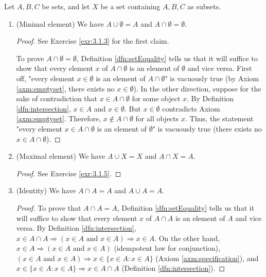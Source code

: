 \documentclass[../main.tex]{subfiles}
\begin{document}
\begin{enumerate}[ref={\thesection.\arabic*}]
    \begin{prp}\label{prp:booleanAlgebra}
        Let $A,B,C$ be sets, and let $X$ be a set containing $A,B,C$ as subsets.
        \begin{enumerate}[label={\textup{(}\alph*\textup{)}}]
            \item (Minimal element) We have $A\cup\emptyset=A$ and $A\cap\emptyset=\emptyset$.
            \begin{proof}
                See Exercise \ref{exr:3.1.3} for the first claim.\par
                To prove $A\cap\emptyset=\emptyset$, Definition \ref{dfn:setEquality} tells us that it will suffice to show that every element $x$ of $A\cap\emptyset$ is an element of $\emptyset$ and vice versa.
                First off, "every element $x\in\emptyset$ is an element of $A\cap\emptyset$" is vacuously true (by Axiom \ref{axm:emptyset}, there exists no $x\in\emptyset$). In the other direction, suppose for the sake of contradiction that $x\in A\cap\emptyset$ for some object $x$. By Definition \ref{dfn:intersection}, $x\in A$ and $x\in \emptyset$. But $x\in\emptyset$ contradicts Axiom \ref{axm:emptyset}. Therefore, $x\notin A\cap\emptyset$ for all objects $x$. Thus, the statement "every element $x\in A\cap\emptyset$ is an element of $\emptyset$" is vacuously true (there exists no $x\in A\cap\emptyset$).
            \end{proof}
            \item (Maximal element) We have $A\cup X=X$ and $A\cap X=A$.
            \begin{proof}
                See Exercise \ref{exr:3.1.5}.
            \end{proof}
            \item (Identity) We have $A\cap A=A$ and $A\cup A=A$.
            \begin{proof}
                To prove that $A\cap A=A$, Definition \ref{dfn:setEquality} tells us that it will suffice to show that every element $x$ of $A\cap A$ is an element of $A$ and vice versa. By Definition \ref{dfn:intersection}, $x\in A\cap A \Longrightarrow (x\in A\text{ and }x\in A) \Longrightarrow x\in A$. On the other hand, $x\in A \Longrightarrow (x\in A\text{ and }x\in A)$ (idempotent law for conjunction), $(x\in A\text{ and }x\in A) \Longrightarrow x\in\{x\in A:x\in A\}$ (Axiom \ref{axm:specification}), and $x\in\{x\in A:x\in A\} \Longrightarrow x\in A\cap A$ (Definition \ref{dfn:intersection}).\par

\end{proof}
\end{enumerate}
\end{prp}
\end{enumerate}
\end{document}
